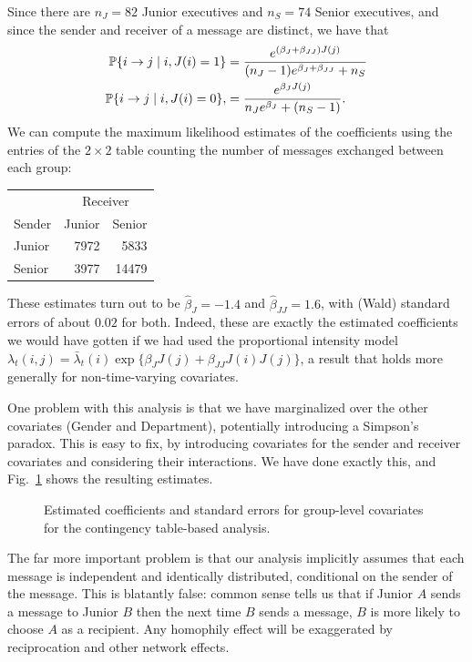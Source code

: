 \documentclass[final]{statsoc}
\begin{document}
Since there are $n_J = 82$ Junior
executives and $n_S = 74$ Senior executives, and since the sender and
receiver of a message are distinct, we have that
\begin{align*}
  \mathbb{P}\{ i \to j \mid i, J(i) = 1 \}
    &=
      \frac{e^{(\beta_J + \beta_{JJ}) J(j)}}
           {(n_J - 1) e^{\beta_J + \beta_{JJ}} + n_S} \\
  \mathbb{P}\{ i \to j \mid i, J(i) = 0 \},
    &=
      \frac{e^{\beta_J J(j)}}
           {n_J e^{\beta_J} + (n_S - 1)}.
\end{align*}
We can compute the maximum likelihood estimates of the coefficients using the
entries of the $2 \times 2$ table counting the number of messages exchanged
between each group:
\begin{center}
\begin{tabular}{lrr}
  \toprule
  & \multicolumn{2}{c}{Receiver} \\
  \cmidrule(l){2-3}
  Sender & Junior & Senior \\
  \midrule
  Junior &  7972  &  5833 \\
  Senior &  3977  & 14479 \\
  \bottomrule
\end{tabular}
\end{center}
These estimates turn out to be $\hat \beta_{J} = -1.4$ and
$\hat \beta_{JJ} = 1.6$, with (Wald) standard errors of about $0.02$
for both.  Indeed, these are exactly the estimated coefficients we would
have gotten if we had used the proportional intensity model
$\lambda_t(i,j) = \bar \lambda_t(i) \exp\{ \beta_J J(j) + \beta_{JJ} J(i) J(j)
\}$, a result that holds more generally for non-time-varying covariates.

One problem with this analysis is that we have marginalized over the
other covariates (Gender and Department), potentially introducing a Simpson's
paradox.  This is easy to fix, by introducing covariates for the sender and
receiver covariates and considering their interactions.   We have done
exactly this, and Fig.~\ref{T:group-static} shows the resulting estimates.

\begin{figure}
  \centering
  \makebox[\textwidth]{
    \scriptsize
    
  }
  \caption{
    Estimated coefficients and standard errors for group-level covariates
    for the contingency table-based analysis.
  }
  \label{T:group-static}
\end{figure}

The far more important
problem is that our analysis implicitly assumes that each message is
independent and identically distributed, conditional on the sender of
the message.  This is blatantly false: common sense tells us that if Junior $A$ sends a message
to Junior $B$ then the next time $B$ sends a message, $B$ is more likely to
choose $A$ as a recipient.  Any homophily effect will be exaggerated by
reciprocation and other network effects.
\end{document}

